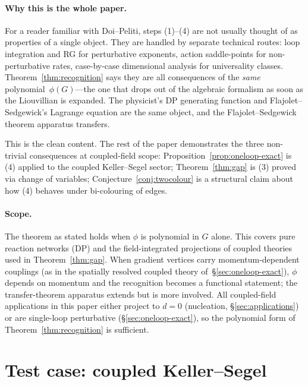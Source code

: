 \documentclass[11pt,a4paper]{article}
\theoremstyle{plain}
\begin{document}
\paragraph{Why this is the whole paper.}
For a reader familiar with Doi--Peliti, steps (1)--(4) are not
usually thought of as properties of a single object.  They are
handled by separate technical routes: loop integration and RG for
perturbative exponents, action saddle-points for non-perturbative
rates, case-by-case dimensional analysis for universality classes.
Theorem~\ref{thm:recognition} says they are all consequences of
the \emph{same} polynomial~$\phi(G)$---the one that drops out of
the algebraic formalism as soon as the Liouvillian is expanded.
The physicist's DP generating function and Flajolet--Sedgewick's
Lagrange equation are the same object, and the Flajolet--Sedgewick
theorem apparatus transfers.

This is the clean content.  The rest of the paper demonstrates the
three non-trivial consequences at coupled-field scope:
Proposition~\ref{prop:oneloop-exact} is (4) applied to the
coupled Keller--Segel sector; Theorem~\ref{thm:gap} is (3) proved
via change of variables; Conjecture~\ref{conj:twocolour} is a
structural claim about how (4) behaves under bi-colouring of edges.

\paragraph{Scope.}
The theorem as stated holds when $\phi$ is polynomial in $G$
alone.  This covers pure reaction networks (DP) and the
field-integrated projections of coupled theories used in
Theorem~\ref{thm:gap}.  When gradient vertices carry
momentum-dependent couplings (as in the spatially resolved
coupled theory of~\S\ref{sec:oneloop-exact}), $\phi$ depends on
momentum and the recognition becomes a functional statement; the
transfer-theorem apparatus extends but is more involved.  All
coupled-field applications in this paper either project to $d = 0$
(nucleation, \S\ref{sec:applications}) or are single-loop
perturbative (\S\ref{sec:oneloop-exact}), so the polynomial form
of Theorem~\ref{thm:recognition} is sufficient.

\section{Test case: coupled Keller--Segel}
\end{document}
